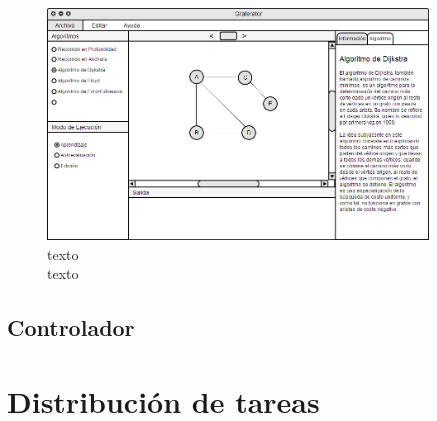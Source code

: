 \documentclass{book}
\begin{document}
\begin{figure}[H]
	\centering
	\includegraphics[width=0.9\textwidth]{images/02-03.png}
	\medskip
	\caption{texto \\ texto}
	\medskip
\end{figure}
\bigskip



\section{Controlador}























%
%
\chapter{Distribución de tareas}


\end{document}
